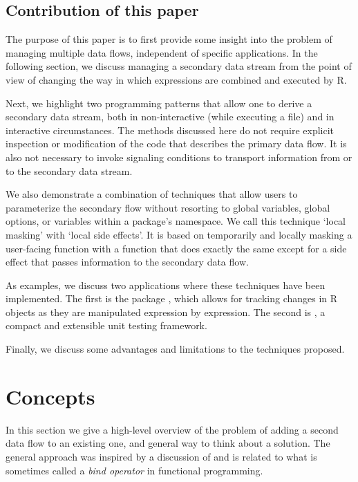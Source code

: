 \subsection{Contribution of this paper}
The purpose of this paper is to first provide some insight into the problem of
managing multiple data flows, independent of specific applications. In the
following section, we discuss managing a secondary data stream from the point
of view of changing the way in which expressions are combined and executed by
R.

Next, we highlight two programming patterns that allow one to derive a
secondary data stream, both in non-interactive (while executing a file) and in
interactive circumstances. The methods discussed here do not require explicit
inspection or modification of the code that describes the primary data flow. It
is also not necessary to invoke signaling conditions to transport information
from or to the secondary data stream.

We also demonstrate a combination of techniques that allow users to
parameterize the secondary flow without resorting to global variables, global
options, or variables within a package's namespace. We call this technique
`local masking' with `local side effects'. It is based on temporarily and
locally masking a user-facing function with a function that does exactly the
same except for a side effect that passes information to the secondary data
flow. 

As examples, we discuss two applications where these techniques have been
implemented. The first is the  package
\citep{loo2019lumberjack}, which allows for tracking changes in R objects as
they are manipulated expression by expression. The second is 
\citep{loo2019tinytest}, a compact and extensible unit testing framework.

Finally, we discuss some advantages and limitations to the techniques proposed.



\section{Concepts}
In this section we give a high-level overview of the problem of adding a second
data flow to an existing one, and general way to think about a solution. The
general approach was inspired by a discussion of \citet{milewski2018category}
and is related to what is sometimes called a \emph{bind operator} in functional
programming. 


